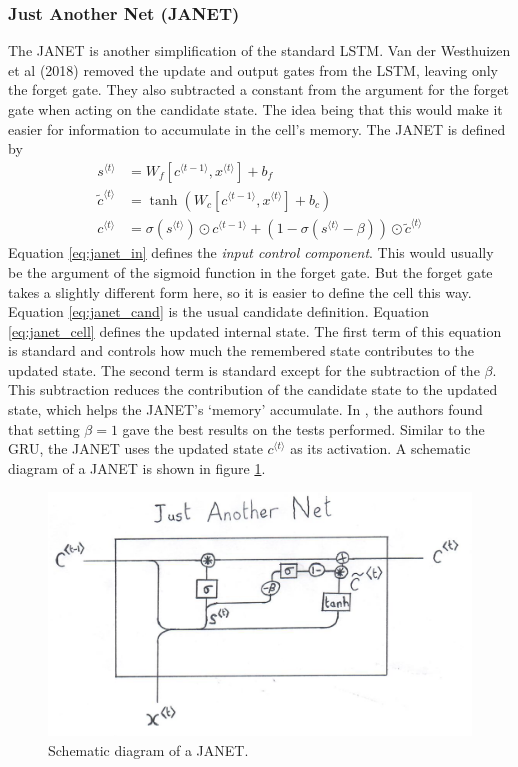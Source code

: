 \documentclass[a4paper,12pt]{article}
\theoremstyle{definition}
\begin{document}
\subsubsection{Just Another Net (JANET)\cite{janet}}
The JANET is another simplification of the standard LSTM. Van der Westhuizen et al (2018) removed the update and output gates from the LSTM, leaving only the forget gate. They also subtracted a constant from the argument for the forget gate when acting on the candidate state. The idea being that this would make it easier for information to accumulate in the cell's memory. The JANET is defined by
\begin{align}
	s^{\langle t \rangle} &= W_f[c^{\langle t-1 \rangle}, x^{\langle t \rangle}] + b_f \label{eq:janet_in} \\
	\tilde{c}^{\langle t \rangle} &= \tanh(W_c[c^{\langle t-1 \rangle}, x^{\langle t \rangle}] + b_c) \label{eq:janet_cand} \\
	c^{\langle t \rangle} &= \sigma(s^{\langle t \rangle}) \odot c^{\langle t-1 \rangle} + (1 - \sigma(s^{\langle t \rangle} - \beta)) \odot \tilde{c}^{\langle t \rangle} \label{eq:janet_cell}
\end{align}
Equation \ref{eq:janet_in} defines the \textit{input control component}. This would usually be the argument of the sigmoid function in the forget gate. But the forget gate takes a slightly different form here, so it is easier to define the cell this way. Equation \ref{eq:janet_cand} is the usual candidate definition. Equation \ref{eq:janet_cell} defines the updated internal state. The first term of this equation is standard and controls how much the remembered state contributes to the updated state. The second term is standard except for the subtraction of the $\beta$. This subtraction reduces the contribution of the candidate state to the updated state, which helps the JANET's `memory' accumulate. In \cite{janet}, the authors found that setting $\beta=1$ gave the best results on the tests performed. Similar to the GRU, the JANET uses the updated state $c^{\langle t \rangle}$ as its activation. A schematic diagram of a JANET is shown in figure \ref{fig:janet}.

\begin{figure}[ht]
	\centering
	\includegraphics[width=\textwidth]{figures/janet.png}
	\caption{Schematic diagram of a JANET.}
	\label{fig:janet}
\end{figure}
\end{document}

